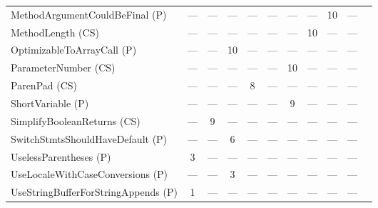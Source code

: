 \begin{landscape}
\begin{table*}[t]
{\begin{tabular}{lcccccccccc}
				\rowcolor{grey}
				MethodArgumentCouldBeFinal (P) &---&---&---&---&---&---&---&10&---\\
				MethodLength (CS) &---&---&---&---&---&---&10&---&---\\
				\rowcolor{grey}
				OptimizableToArrayCall (P) &---&---&10&---&---&---&---&---&---\\
				ParameterNumber (CS) &---&---&---&---&---&10&---&---&---\\
				\rowcolor{grey}
				ParenPad (CS) &---&---&---&8&---&---&---&---&---\\
				ShortVariable (P) &---&---&---&---&---&9&---&---&---\\
				\rowcolor{grey}
				SimplifyBooleanReturns (CS) &---&9&---&---&---&---&---&---&---\\
				SwitchStmtsShouldHaveDefault (P) &---&---&6&---&---&---&---&---&---\\
				\rowcolor{grey}
				UselessParentheses (P) &3&---&---&---&---&---&---&---&---\\
				UseLocaleWithCaseConversions (P) &---&---&3&---&---&---&---&---&---\\
				\rowcolor{grey}
				UseStringBufferForStringAppends (P) &1&---&---&---&---&---&---&---&---\\
				\hline
			\end{tabular}

	}
	\vspace{-2mm}
\end{table*}
\end{landscape}

